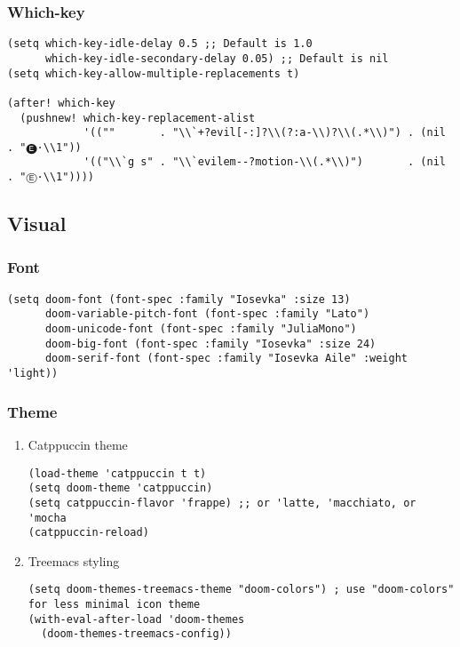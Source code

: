 \documentclass[c]{article}
\theoremstyle{plain}%
\theoremstyle{definition}
\theoremstyle{remark}
\begin{document}
\subsubsection{Which-key}
\label{sec:org7395894}
\begin{verbatim}
(setq which-key-idle-delay 0.5 ;; Default is 1.0
      which-key-idle-secondary-delay 0.05) ;; Default is nil
(setq which-key-allow-multiple-replacements t)

(after! which-key
  (pushnew! which-key-replacement-alist
            '((""       . "\\`+?evil[-:]?\\(?:a-\\)?\\(.*\\)") . (nil . "🅔·\\1"))
            '(("\\`g s" . "\\`evilem--?motion-\\(.*\\)")       . (nil . "Ⓔ·\\1"))))
\end{verbatim}
\subsection{Visual}
\label{sec:org482c269}
\subsubsection{Font}
\label{sec:org585a56b}
\begin{verbatim}
(setq doom-font (font-spec :family "Iosevka" :size 13)
      doom-variable-pitch-font (font-spec :family "Lato")
      doom-unicode-font (font-spec :family "JuliaMono")
      doom-big-font (font-spec :family "Iosevka" :size 24)
      doom-serif-font (font-spec :family "Iosevka Aile" :weight 'light))
\end{verbatim}
\subsubsection{Theme}
\label{sec:orgfd17940}
\begin{enumerate}
\item Catppuccin theme
\label{sec:orgb9aebba}
\begin{verbatim}
(load-theme 'catppuccin t t)
(setq doom-theme 'catppuccin)
(setq catppuccin-flavor 'frappe) ;; or 'latte, 'macchiato, or 'mocha
(catppuccin-reload)
\end{verbatim}
\item Treemacs styling
\label{sec:org14e0ea8}
\begin{verbatim}
(setq doom-themes-treemacs-theme "doom-colors") ; use "doom-colors" for less minimal icon theme
(with-eval-after-load 'doom-themes
  (doom-themes-treemacs-config))
\end{verbatim}
\end{enumerate}
\end{document}
